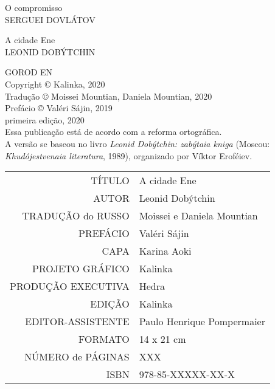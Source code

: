 \noindent{}O compromisso\\
SERGUEI DOVLÁTOV
\medskip

\noindent{}A cidade Ene \\
LEONID DOBÝTCHIN

\newpage
\pagestyle{empty}
\MyriadPro
\scriptsize
\begin{center}
GOROD EN\\[6pt]

Copyright © Kalinka, 2020\\[6pt]

Tradução © Moissei Mountian, Daniela Mountian, 2020\\[6pt]

Prefácio © Valéri Sájin, 2019\\[6pt]

primeira edição, 2020\\[40pt]


Essa publicação está de acordo com a reforma ortográfica.\\[6pt]
A versão se baseou no livro \emph{Leonid Dobýtchin: zabýtaia kniga} (Moscou: \emph{Khudójestvenaia literatura}, 1989), organizado por Víktor Eroféiev.\\[6pt]	
\end{center}


\bigskip

\begin{vplace}[1]
\begin{table}[ht!]
\MyriadPro
\scriptsize
\begin{tabular}{rl}
TÍTULO            & A cidade Ene 									   \\[2pt]
AUTOR             & Leonid Dobýtchin                          		   \\[2pt]
TRADUÇÃO do RUSSO & Moissei e Daniela Mountian		                   \\[2pt]
PREFÁCIO          & Valéri Sájin	                                   \\[2pt]
CAPA              & Karina Aoki		                                   \\[2pt]
PROJETO GRÁFICO   & Kalinka                                            \\[2pt]
PRODUÇÃO EXECUTIVA & Hedra                                             \\[2pt]
EDIÇÃO            & Kalinka 		                                   \\[2pt] 
EDITOR-ASSISTENTE & Paulo Henrique Pompermaier                         \\[2pt] 
FORMATO           & 14 x 21 cm                                         \\[2pt]
NÚMERO de PÁGINAS & XXX                                                \\[2pt]
ISBN              & 978-85-XXXXX-XX-X                                 
\end{tabular}
\end{table}
\end{vplace}

